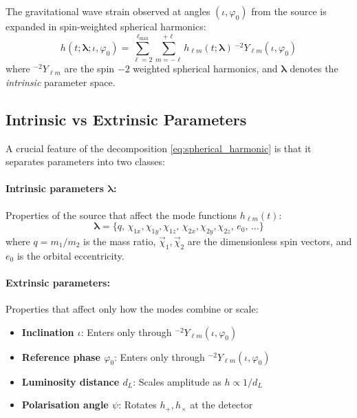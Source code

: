 \documentclass[11pt,a4paper]{article}
\newcommand{\hlm}{h_{\ell m}}
\newcommand{\Ylm}{{}^{-2}Y_{\ell m}}
\newcommand{\veclambda}{\bm{\lambda}}
\newcommand{\vecchi}{\vec{\chi}}
\begin{document}
The gravitational wave strain observed at angles $(\iota, \varphi_0)$ from the source is expanded in spin-weighted spherical harmonics:
\begin{equation}
    \boxed{
    h(t; \veclambda; \iota, \varphi_0) = \sum_{\ell=2}^{\ell_{\max}} \sum_{m=-\ell}^{+\ell} \hlm(t; \veclambda) \, \Ylm(\iota, \varphi_0)
    }
    \label{eq:spherical_harmonic}
\end{equation}
where $\Ylm$ are the spin $-2$ weighted spherical harmonics, and $\veclambda$ denotes the \emph{intrinsic} parameter space.

\subsection{Intrinsic vs Extrinsic Parameters}
\label{sec:intrinsic_extrinsic}

A crucial feature of the decomposition \eqref{eq:spherical_harmonic} is that it separates parameters into two classes:

\paragraph{Intrinsic parameters $\veclambda$:} Properties of the source that affect the mode functions $\hlm(t)$:
\begin{equation}
    \veclambda = \{q, \, \chi_{1x}, \chi_{1y}, \chi_{1z}, \, \chi_{2x}, \chi_{2y}, \chi_{2z}, \, e_0, \, \ldots\}
    \label{eq:intrinsic_params}
\end{equation}
where $q = m_1/m_2$ is the mass ratio, $\vecchi_1, \vecchi_2$ are the dimensionless spin vectors, and $e_0$ is the orbital eccentricity.

\paragraph{Extrinsic parameters:} Properties that affect only how the modes combine or scale:
\begin{itemize}
    \item \textbf{Inclination $\iota$}: Enters only through $\Ylm(\iota, \varphi_0)$
    \item \textbf{Reference phase $\varphi_0$}: Enters only through $\Ylm(\iota, \varphi_0)$
    \item \textbf{Luminosity distance $d_L$}: Scales amplitude as $h \propto 1/d_L$
    \item \textbf{Polarisation angle $\psi$}: Rotates $h_+, h_\times$ at the detector
\end{itemize}
\end{document}
